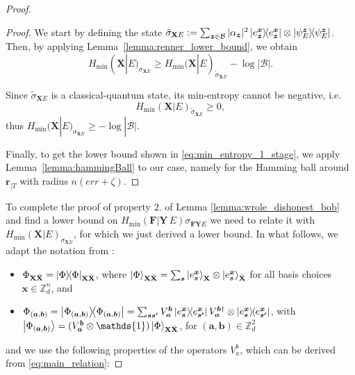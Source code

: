 \begin{proof}
\begin{lemma}
\end{lemma}
\begin{proof}

 We start by defining the state $\tilde{\sigma}_{\mathbf{X} E}: = \sum_{\bm{z}\in \mathcal{B}} |\alpha_{\bm{z}}|^2 \ketbra{e^{\boldsymbol{x}}_{\boldsymbol{z}}} \otimes \ketbra{\psi^{\boldsymbol{z}}_{E}}$. 
Then, by applying Lemma~\ref{lemma:renner_lower_bound}, we obtain
\begin{equation*}
    H_{\text{min}}(\mathbf{X} |E)_{\sigma_{\mathbf{X} E}} \geq H_{\text{min}}(\mathbf{X} | E)_{\tilde{\sigma}_{\mathbf{X} E}} - \log |\mathcal{B}|.
\end{equation*}


Since $\tilde{\sigma}_{\mathbf{X} E}$  is a classical-quantum state, its min-entropy cannot be negative, i.e. $$H_{\text{min}}(\mathbf{X} | E)_{\tilde{\sigma}_{\mathbf{X} E}} \geq 0,$$ thus $H_{\text{min}}(\mathbf{X} |E)_{\sigma_{\mathbf{X} E}} \geq -\log |\mathcal{B}|$. 

Finally, to get the lower bound shown in \eqref{eq:min_entropy_1_stage}, we apply Lemma~\ref{lemma:hammingBall} to our case, namely for the Hamming ball around $\boldsymbol{r}_{|\bar{T}}$ with radius $n(err + \zeta)$.

\end{proof}

To complete the proof of property 2. of Lemma \ref{lemma:wrole_dishonest_bob} and find a lower bound on $H_\text{min}(\mathbf{F}|\mathbf{Y}\, E)\sigma_{\mathbf{F} \mathbf{Y}E}$  we need to relate it with $H_{\text{min}}(\mathbf{X} |E)_{\sigma_{\mathbf{X} E}}$, for which we just derived a lower bound. In what follows, we 
  adapt the notation from \cite{Dupuis2015}:

\begin{itemize}
    \item $\Phi_{\mathbf{X} \bar{\mathbf{X}}} = \ketbra{\Phi}_{\mathbf{X} \bar{\mathbf{X}}}$, where $\ket{\Phi}_{\mathbf{X} \bar{\mathbf{X}}} = \sum_{\bm{s}} \ket{e^{\bm{x}}_{\bm{s}}}_{\mathbf{X} } \otimes \ket{e^{\bm{x}}_{\bm{s}}}_{\bar{\mathbf{X}}}$ for all basis choices   $\bm{x}  \in\mathbb{Z}^n_d$, and
    \item $\Phi_{(\bm{a},\bm{b})} = \ketbra{\Phi_{(\bm{a},\bm{b})}} = \sum_{\bm{s s'}} V^{\bm{b}}_{\bm{a}} \ketbra{e^{\bm{x}}_{\bm{s}}}{e^{\bm{x}}_{\bm{s'}}} V^{\bm{b}\dagger}_{\bm{a}} \otimes \ketbra{e^{\bm{x}}_{\bm{s}}}{e^{\bm{x}}_{\bm{s'}}}$, with $\ket{\Phi_{(\bm{a},\bm{b})}} = (V^{\bm{b}}_{\bm{a}} \otimes \mathds{1}) \ket{\Phi}_{\mathbf{X} \bar{\mathbf{X}}}$,  for $(\bm{a},\bm{b})\in\mathbb{Z}^2_d$
\end{itemize}
and we use the following properties of the operators $V_a^b$, which can be derived from \eqref{eq:main_relation}:


\end{proof}
